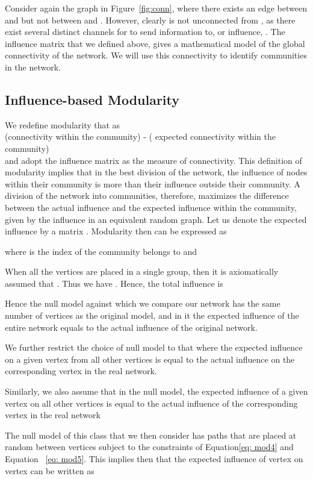 \documentclass{sig-alternate}
\newcommand{\figref}[1]{Figure~\ref{#1}}
\begin{document}
Consider again the graph in \figref{fig:conn}, where there exists an edge between  and  but not between  and . However, clearly  is not unconnected from , as there exist several distinct channels for  to send information to, or influence, .
The influence matrix that we defined above, gives a mathematical model of the global connectivity of the network. We will use this connectivity to identify communities in the network.


\subsection{Influence-based Modularity}
We redefine modularity  that as \\
(connectivity within the community) - ( expected connectivity within the community)\\
and adopt the influence matrix  as the measure of connectivity.
This definition of modularity implies that in the best division of the network, the influence of nodes within their community is more than their influence outside their community. A division of the network into communities, therefore, maximizes the difference between the actual influence and the expected  influence within the community, given by the influence in an equivalent random graph.
Let us denote the expected influence by a  matrix .
Modularity  then can be expressed as

where  is the index of the community  belongs to and 

When all the vertices are placed in a single group, then it is axiomatically assumed that . Thus we have . Hence, the total influence  is

Hence the null model against which we compare our network has the same number of vertices  as the original model, and in it  the expected influence of the entire network equals to the actual influence of the original network. 

We further restrict the choice of null model to that where the expected  influence  on a given vertex  from all other vertices  is equal to the actual influence on the corresponding vertex in the real network.

Similarly, we also assume that in the null model, the expected  influence  of a given vertex  on all other vertices  is equal to the actual influence of the corresponding vertex in the real network

The null model of this class that we then consider has paths that are placed at random between vertices subject to the constraints  of Equation\eqref{eq: mod4} and  Equation ~\eqref{eq: mod5}.
This implies then that the expected influence  of vertex  on vertex  can be written as
\end{document}
